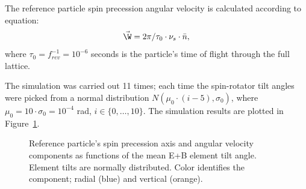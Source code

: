  The reference particle spin precession angular velocity is calculated 
 according to equation:~\cite[p.~4]{COSY:SpinTuneMapping}
\[
\vec\W = 2\pi/\tau_0\cdot \nu_s \cdot \bar n,
\]
where $\tau_0 = f^{-1}_{rev} = 10^{-6}$ seconds is the particle's time of flight through the full lattice.

The simulation was carried out 11 times; each time the spin-rotator tilt angles were picked
from a normal distribution $N(\mu_0\cdot(i-5), \sigma_0)$, where 
$\mu_0 = 10\cdot \sigma_0 = 10^{-4}$ rad, $i\in\lbrace0,\dots, 10\rbrace$. The simulation
results are plotted in Figure~\ref{fig:Linearity_test_shifting_gauss}.

\begin{figure}[!h]
	\centering
	\caption{Reference particle's spin precession axis and angular velocity components as
		 functions of the mean E+B element tilt angle. Element tilts are normally distributed.
		Color identifies the component; radial (blue) and vertical (orange).\label{fig:Linearity_test_shifting_gauss}}
\end{figure}

